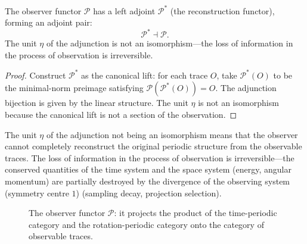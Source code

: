 \begin{corollary}\label{cor:observer_adjunction}
The observer functor $\mathcal{P}$ has a left adjoint $\mathcal{P}^*$ (the reconstruction functor), forming an adjoint pair:
\[
\mathcal{P}^* \dashv \mathcal{P}.
\]
The unit $\eta$ of the adjunction is not an isomorphism---the loss of information in the process of observation is irreversible.
\end{corollary}

\begin{proof}
Construct $\mathcal{P}^*$ as the canonical lift: for each trace $O$, take $\mathcal{P}^*(O)$ to be the minimal-norm preimage satisfying $\mathcal{P}(\mathcal{P}^*(O)) = O$. The adjunction bijection is given by the linear structure. The unit $\eta$ is not an isomorphism because the canonical lift is not a section of the observation.
\end{proof}

\begin{remark}\label{rem:observer_conservation_breaking}
The unit $\eta$ of the adjunction not being an isomorphism means that the observer cannot completely reconstruct the original periodic structure from the observable traces. The loss of information in the process of observation is irreversible---the conserved quantities of the time system and the space system (energy, angular momentum) are partially destroyed by the divergence of the observing system (symmetry centre $1$) (sampling decay, projection selection).
\end{remark}

\begin{figure}[htbp]
\centering
{}
\caption{The observer functor $\mathcal{P}$: it projects the product of the time-periodic category and the rotation-periodic category onto the category of observable traces.}
\label{fig:observer_functor}
\end{figure}

